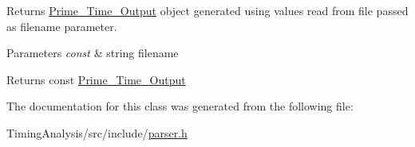 Returns \hyperlink{classPrime__Time__Output__Parser_1_1Prime__Time__Output}{Prime\-\_\-\-Time\-\_\-\-Output} object generated using values read from file passed as filename parameter. 


\begin{DoxyParams}{Parameters}
{\em const} & string filename\\
\hline
\end{DoxyParams}
\begin{DoxyReturn}{Returns}
const \hyperlink{classPrime__Time__Output__Parser_1_1Prime__Time__Output}{Prime\-\_\-\-Time\-\_\-\-Output} 
\end{DoxyReturn}


The documentation for this class was generated from the following file\-:\begin{DoxyCompactItemize}
\item 
Timing\-Analysis/src/include/\hyperlink{parser_8h}{parser.\-h}\end{DoxyCompactItemize}
